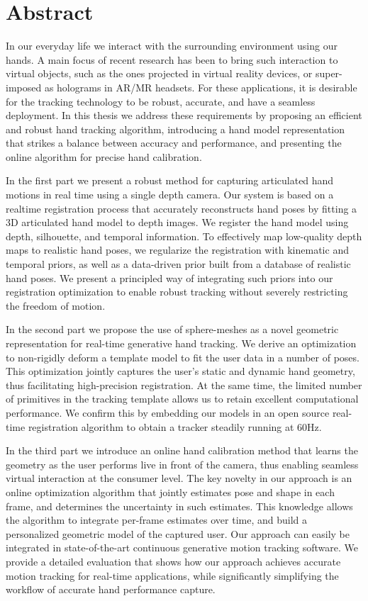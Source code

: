 
\chapter*{Abstract}

In our everyday life we interact with the surrounding environment using our hands. A main focus of recent research has been to bring such interaction to virtual objects, such as the ones projected in virtual reality devices, or super-imposed as holograms in AR/MR headsets. For these applications, it is desirable for the tracking technology to be robust, accurate, and have a seamless deployment. In this thesis we address these requirements by proposing an efficient and robust hand tracking algorithm, introducing a hand model representation that strikes a balance between accuracy and performance, and presenting the online algorithm for precise hand calibration.


In the first part we present a robust method for capturing articulated hand motions in real time using a single depth camera. Our system is based on a realtime registration process that accurately reconstructs hand poses by fitting a 3D articulated hand model to depth images. We register the hand model using depth, silhouette, and temporal information. To effectively map low-quality depth maps to realistic hand poses, we regularize the registration with kinematic and temporal priors, as well as a data-driven prior built from a database of realistic hand poses. We present a principled way of integrating such priors into our registration optimization to enable robust tracking without severely restricting the freedom of motion. 

In the second part we propose the use of sphere-meshes as a novel geometric representation for real-time generative hand tracking.  We derive an optimization to non-rigidly deform a template model to fit the user data in a number of poses. This optimization jointly captures the user's static and dynamic hand geometry, thus facilitating high-precision registration. At the same time, the limited number of primitives in the tracking template allows us to retain excellent computational performance. We confirm this by embedding our models in an open source real-time registration algorithm to obtain a tracker steadily running at 60Hz.

In the third part we introduce an online hand calibration method that learns the geometry as the user performs live in front of the camera, thus enabling seamless virtual interaction at the consumer level. The key novelty in our approach is an online optimization algorithm that jointly estimates pose and shape in each frame, and determines the uncertainty in such estimates. This knowledge allows the algorithm to integrate per-frame estimates over time, and build a personalized geometric model of the captured user. Our approach can easily be integrated in state-of-the-art continuous generative motion tracking software. We provide a detailed evaluation that shows how our approach achieves accurate motion tracking for real-time applications, while significantly simplifying the workflow of accurate hand performance capture.


